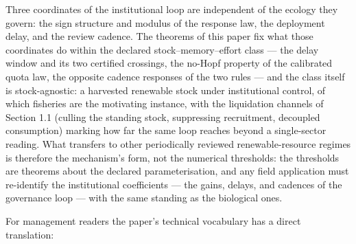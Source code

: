 \documentclass[11pt]{article}
\begin{document}
Three coordinates of the institutional loop are independent of the
ecology they govern: the sign structure and modulus of the response law,
the deployment delay, and the review cadence. The theorems of this paper
fix what those coordinates do within the declared stock--memory--effort
class --- the delay window and its two certified crossings, the no-Hopf
property of the calibrated quota law, the opposite cadence responses of
the two rules --- and the class itself is stock-agnostic: a harvested
renewable stock under institutional control, of which fisheries are the
motivating instance, with the liquidation channels of Section 1.1
(culling the standing stock, suppressing recruitment, decoupled
consumption) marking how far the same loop reaches beyond a
single-sector reading. What transfers to other periodically reviewed
renewable-resource regimes is therefore the mechanism's form, not the
numerical thresholds: the thresholds are theorems about the declared
parameterisation, and any field application must re-identify the
institutional coefficients --- the gains, delays, and cadences of the
governance loop --- with the same standing as the biological ones.

For management readers the paper's technical vocabulary has a direct
translation:
\end{document}
